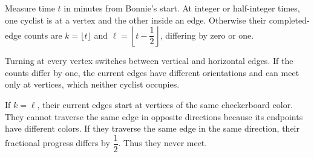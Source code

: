 Measure time $t$ in minutes from Bonnie's start. At integer or half-integer times, one cyclist is at a vertex and the other inside an edge. Otherwise their completed-edge counts are $k=\lfloor t\rfloor$ and $\ell=\left\lfloor t-\dfrac{1}{2}\right\rfloor$, differing by zero or one.

Turning at every vertex switches between vertical and horizontal edges. If the counts differ by one, the current edges have different orientations and can meet only at vertices, which neither cyclist occupies.

If $k=\ell$, their current edges start at vertices of the same checkerboard color. They cannot traverse the same edge in opposite directions because its endpoints have different colors. If they traverse the same edge in the same direction, their fractional progress differs by $\dfrac{1}{2}$. Thus they $\boxed{\text{never meet}}$.
